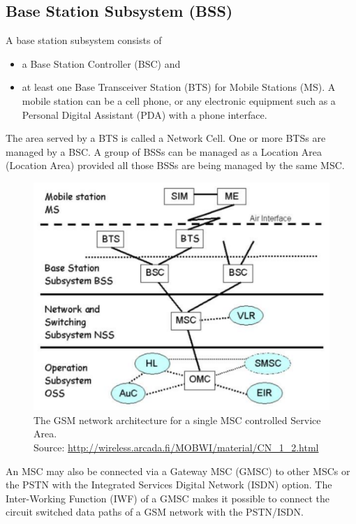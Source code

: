 \subsection{Base Station Subsystem (BSS)}

A base station subsystem consists of
\begin{itemize}[noitemsep,topsep=0pt,parsep=0pt,partopsep=0pt] 
\item a Base Station Controller (BSC) and
\item at least one Base Transceiver Station (BTS) for Mobile Stations (MS).
A mobile station can be a cell phone, or any electronic equipment such as a 
Personal Digital Assistant (PDA) with a phone interface.
\end{itemize}

The area served by a BTS is called a Network Cell. One or more BTSs
are managed by a BSC.  A group of BSSs can be managed as a Location 
Area (Location Area) provided all those BSSs are being managed by the same 
MSC.


\begin{figure}
\centering
\includegraphics[scale=0.4]{archMSCServiceArea}
\caption[Network architecture for a single MSC Service Area]{The GSM network 
architecture for a single MSC controlled Service Area.\\
\footnotesize{Source: 
\url{http://wireless.arcada.fi/MOBWI/material/CN\_1\_2.html}}}
\end{figure}


An MSC may also be connected via a Gateway MSC (GMSC) to other MSCs or the
PSTN with the Integrated Services Digital Network (ISDN) option. The 
Inter-Working Function (IWF) of a GMSC makes it possible to connect the 
circuit switched data paths of a GSM network with the PSTN/ISDN.

